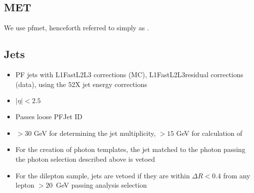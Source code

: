 \subsection{MET}

We use pfmet, henceforth referred to simply as \MET.

\subsection{Jets}
\label{sec:jetsel}

\begin{itemize}
\item PF jets with L1FastL2L3 corrections (MC), L1FastL2L3residual corrections (data), using the 52X jet energy corrections
\item $|\eta| < 2.5$
\item Passes loose PFJet ID
\item \pt $ > 30$ GeV for determining the jet multiplicity, \pt $ > 15$ GeV for calculation of \Ht
\item For the creation of photon templates, the jet matched to the photon passing the photon selection described above is vetoed
\item For the dilepton sample, jets are vetoed if they are within $\Delta R < 0.4$ from any lepton \pt $ > 20$~GeV passing analysis selection
\end{itemize}

